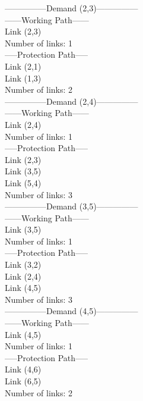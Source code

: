 ---------------Demand (2,3)--------------- \\

------Working Path------ \\
Link  (2,3) \\
Number of links: 1 \\

-----Protection Path----- \\
Link  (2,1) \\
Link  (1,3) \\
Number of links: 2 \\


---------------Demand (2,4)--------------- \\

------Working Path------ \\
Link  (2,4) \\
Number of links: 1 \\

-----Protection Path----- \\
Link  (2,3) \\
Link  (3,5) \\
Link  (5,4) \\
Number of links: 3 \\


---------------Demand (3,5)--------------- \\

------Working Path------ \\
Link  (3,5) \\
Number of links: 1 \\

-----Protection Path----- \\
Link  (3,2) \\
Link  (2,4) \\
Link  (4,5) \\
Number of links: 3 \\


---------------Demand (4,5)--------------- \\

------Working Path------ \\
Link  (4,5) \\
Number of links: 1 \\

-----Protection Path----- \\
Link  (4,6) \\
Link  (6,5) \\
Number of links: 2 \\


